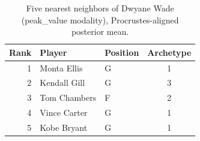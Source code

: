\begin{table}[htbp]
  \centering\small
  \begin{tabular}{rllc}
    \toprule
    Rank & Player & Position & Archetype \\
    \midrule
    1 & Monta Ellis & G & 1 \\
    2 & Kendall Gill & G & 3 \\
    3 & Tom Chambers & F & 2 \\
    4 & Vince Carter & G & 1 \\
    5 & Kobe Bryant & G & 1 \\
    \bottomrule
  \end{tabular}
  \caption{Five nearest neighbors of Dwyane Wade (peak_value modality), Procrustes-aligned posterior mean.}
  \label{tab:Dwyane_Wade_neighbors_peak_value}
\end{table}


